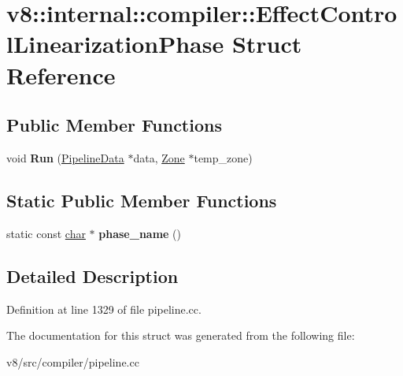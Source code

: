 \hypertarget{structv8_1_1internal_1_1compiler_1_1EffectControlLinearizationPhase}{}\section{v8\+:\+:internal\+:\+:compiler\+:\+:Effect\+Control\+Linearization\+Phase Struct Reference}
\label{structv8_1_1internal_1_1compiler_1_1EffectControlLinearizationPhase}
\subsection*{Public Member Functions}
\begin{DoxyCompactItemize}
\item 
\mbox{\label{structv8_1_1internal_1_1compiler_1_1EffectControlLinearizationPhase_ac70bbeaf7ea05b8135044605b4eb6a99}} 
void {\bfseries Run} (\mbox{\hyperlink{classv8_1_1internal_1_1compiler_1_1PipelineData}{Pipeline\+Data}} $\ast$data, \mbox{\hyperlink{classv8_1_1internal_1_1Zone}{Zone}} $\ast$temp\+\_\+zone)
\end{DoxyCompactItemize}
\subsection*{Static Public Member Functions}
\begin{DoxyCompactItemize}
\item 
\mbox{\label{structv8_1_1internal_1_1compiler_1_1EffectControlLinearizationPhase_ab9da34ba495ade47eb7a44a251531b72}} 
static const \mbox{\hyperlink{classchar}{char}} $\ast$ {\bfseries phase\+\_\+name} ()
\end{DoxyCompactItemize}


\subsection{Detailed Description}


Definition at line 1329 of file pipeline.\+cc.



The documentation for this struct was generated from the following file\+:\begin{DoxyCompactItemize}
\item 
v8/src/compiler/pipeline.\+cc\end{DoxyCompactItemize}
